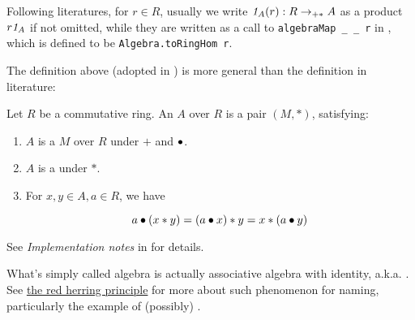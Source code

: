 \begin{remark}
    \label{mk:AlgebraNotation}

    Following literatures, for $r \in R$, 
    usually we write $\mathit{1}_A(r) : R \to_{+*} A$ as a product $r \mathit{1}_A$ if not omitted,
    while they are written as a call to \lstinline|algebraMap _ _ r| in \Mathlib,
    which is defined to be \lstinline|Algebra.toRingHom r|.

\end{remark}

\begin{remark}
    \label{mk:AlgebraLiterature}

    The definition above (adopted in \Mathlib) is more general than the definition in literature:

    Let $R$ be a commutative ring. An  $A$ over $R$ is a pair $(M, *)$, satisfying:

    \begin{enumerate}
    \item $A$ is a  $M$ over $R$ under $+$ and $\bullet$.

    \item $A$ is a  under $*$.

    \item For $x, y \in A, a \in R$, we have
    
    $$
    a \bullet (x * y) = (a \bullet x) * y = x * (a \bullet y)
    $$

    \end{enumerate}

    See \emph{Implementation notes} in  for details.
    
\end{remark}

\begin{remark}
    \label{mk:AlgebraName}

    What's simply called algebra is actually associative algebra with identity, a.k.a. . See
    \href{https://ncatlab.org/nlab/show/red%20herring%20principle}{the red herring principle}
    for more about such phenomenon for naming, particularly the example of (possibly) .
    
\end{remark}

